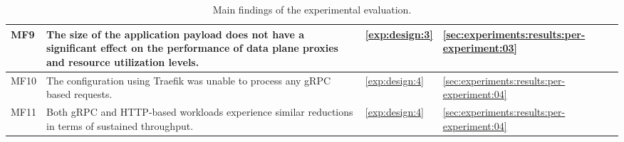 \begin{table}[]
\begin{tabularx}{\linewidth}{@{}lXll@{}}
MF9 &
The size of the application payload does not have a significant effect on the performance of data plane proxies and resource utilization levels. &
\ref{exp:design:3} &
\cref{sec:experiments:results:per-experiment:03} \\
\midrule  
  
MF10 &
The configuration using Traefik was unable to process any gRPC based requests. &
\ref{exp:design:4} &
\cref{sec:experiments:results:per-experiment:04} \\
\midrule  
  
MF11 &
Both gRPC and HTTP-based workloads experience similar reductions in terms of sustained throughput. &
\ref{exp:design:4} &
\cref{sec:experiments:results:per-experiment:04} \\ 
  
\bottomrule
\end{tabularx}

\caption[Main findings of the experimental evaluation]{Main findings of the experimental evaluation.}
\label{tab:experiment:main-fidings}
\end{table}
